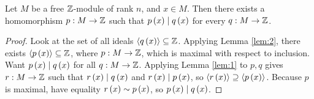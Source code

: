 \begin{lemma}
\label{lem:3}
Let $ M $ be a free $ \mathbb{Z} $-module of rank $ n $, and $ x \in M $. Then there exists a homomorphism $ p : M \to \mathbb{Z} $ such that $ p\left( x \right) \mid q\left( x \right) $ for every $ q : M \to \mathbb{Z} $.
\end{lemma}

\begin{proof}
Look at the set of all ideals $ \left\langle q\left( x \right) \right\rangle \subseteq \mathbb{Z} $. Applying Lemma \ref{lem:2}, there exists $ \left\langle p\left( x \right) \right\rangle \subseteq \mathbb{Z} $, where $ p : M \to \mathbb{Z} $, which is maximal with respect to inclusion. Want $ p\left( x \right) \mid q\left( x \right) $ for all $ q : M \to \mathbb{Z} $. Applying Lemma \ref{lem:1} to $ p, q $ gives $ r : M \to \mathbb{Z} $ such that $ r\left( x \right) \mid q\left( x \right) $ and $ r\left( x \right) \mid p\left( x \right) $, so $ \left\langle r\left( x \right) \right\rangle \supseteq \left\langle p\left( x \right) \right\rangle $. Because $ p $ is maximal, have equality $ r\left( x \right) \sim p\left( x \right) $, so $ p\left( x \right) \mid q\left( x \right) $.
\end{proof}


